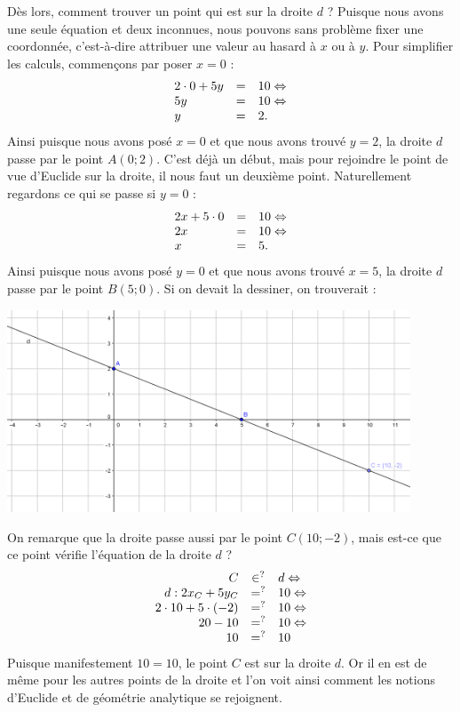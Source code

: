 \begin{exemple}
Dès lors, comment trouver un point qui est sur la droite $d$ ? Puisque nous avons une seule équation et deux inconnues, nous pouvons sans problème fixer une coordonnée, c'est-à-dire attribuer une valeur au hasard à $x$ ou à $y$. Pour simplifier les calculs, commençons par poser $x=0$ :
$$
\begin{array}{lcl}
2 \cdot 0 + 5 y &=& 10 \Leftrightarrow \\
5y  &=& 10 \Leftrightarrow \\
y &=& 2.
\end{array}
$$
Ainsi puisque nous avons posé $x=0$ et que nous avons trouvé $y=2$, la droite $d$ passe par le point $A(0;2)$. C'est déjà un début, mais pour rejoindre le point de vue d'Euclide sur la droite, il nous faut un deuxième point. Naturellement regardons ce qui se passe si $y=0$ :
$$
\begin{array}{lcl}
2x + 5\cdot 0 &=& 10 \Leftrightarrow \\
2x &=& 10 \Leftrightarrow \\
x &=& 5.
\end{array}
$$
Ainsi puisque nous avons posé $y=0$ et que nous avons trouvé $x=5$, la droite $d$ passe par le point $B(5;0)$. Si on devait la dessiner, on trouverait :
\begin{center}
\includegraphics[width = 0.9\textwidth]{droite/droite_ex.png}
\end{center}
On remarque que la droite passe aussi par le point $C(10;-2)$, mais est-ce que ce point vérifie l'équation de la droite $d$ ?
$$
\begin{array}{rcl}
C &\in^?& d \Leftrightarrow \\
d:2x_C + 5y_C &=^?& 10\Leftrightarrow \\
2\cdot 10 + 5 \cdot (-2) &=^?& 10 \Leftrightarrow \\
20 - 10 &=^?& 10 \Leftrightarrow \\
10 &=^?& 10
\end{array}
$$
Puisque manifestement $10 = 10$, le point $C$ est sur la droite $d$. Or il en est de même pour les autres points de la droite et l'on voit ainsi comment les notions d'Euclide et de géométrie analytique se rejoignent.
\end{exemple}


